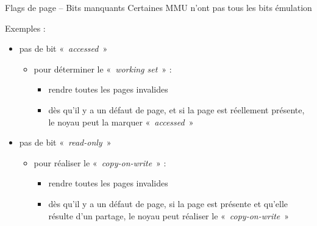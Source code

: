 \begin {frame} {Flags de page -- Bits manquants}
    Certaines MMU n'ont pas tous les bits \implique émulation

    \vspace* {3mm}

    Exemples :

    \begin {itemize}
	\item pas de bit «~\textit {accessed}~»
	    \begin {itemize}
		\item pour déterminer le «~\textit {working set}~» :
		    \begin {itemize}
			\item rendre toutes les pages invalides
			\item dès qu'il y a un défaut de page, et si
			    la page est réellement présente, le noyau
			    peut la marquer «~\textit {accessed}~»
		    \end {itemize}
	    \end {itemize}
	\item pas de bit «~\textit {read-only}~»
	    \begin {itemize}
		\item pour réaliser le «~\textit {copy-on-write}~» :
		    \begin {itemize}
			\item rendre toutes les pages invalides
			\item dès qu'il y a un défaut de page, si
			    la page est présente et qu'elle résulte
			    d'un partage, le noyau peut réaliser le
			    «~\textit {copy-on-write}~»
		    \end {itemize}
	    \end {itemize}
    \end {itemize}
\end {frame}
